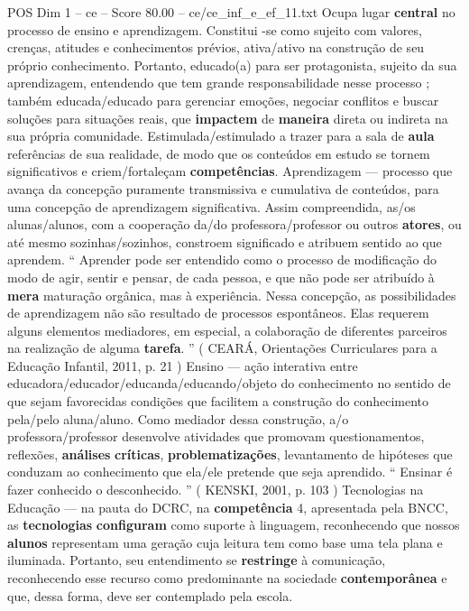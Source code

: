 \begin{textsample}{POS Dim 1 – ce – Score 80.00 – ce/ce\_inf\_e\_ef\_11.txt}
Ocupa lugar \textbf{central} no processo de ensino e aprendizagem.
Constitui -se como sujeito com valores, crenças, atitudes e conhecimentos prévios, ativa/ativo na construção de seu próprio conhecimento.
Portanto, educado(a) para ser protagonista, sujeito da sua aprendizagem, entendendo que tem grande responsabilidade nesse processo ; também educada/educado para gerenciar emoções, negociar conflitos e buscar soluções para situações reais, que \textbf{impactem} de \textbf{maneira} direta ou indireta na sua própria comunidade.
Estimulada/estimulado a trazer para a sala de \textbf{aula} referências de sua realidade, de modo que os conteúdos em estudo se tornem significativos e criem/fortaleçam \textbf{competências}.
Aprendizagem — processo que avança da concepção puramente transmissiva e cumulativa de conteúdos, para uma concepção de aprendizagem significativa.
Assim compreendida, as/os alunas/alunos, com a cooperação da/do professora/professor ou outros \textbf{atores}, ou até mesmo sozinhas/sozinhos, constroem significado e atribuem sentido ao que aprendem. “ Aprender pode ser entendido como o processo de modificação do modo de agir, sentir e pensar, de cada pessoa, e que não pode ser atribuído à \textbf{mera} maturação orgânica, mas à experiência.
Nessa concepção, as possibilidades de aprendizagem não são resultado de processos espontâneos.
Elas requerem alguns elementos mediadores, em especial, a colaboração de diferentes parceiros na realização de alguma \textbf{tarefa}. ” ( CEARÁ, Orientações Curriculares para a Educação Infantil, 2011, p. 21 ) Ensino — ação interativa entre educadora/educador/educanda/educando/objeto do conhecimento no sentido de que sejam favorecidas condições que facilitem a construção do conhecimento pela/pelo aluna/aluno.
Como mediador dessa construção, a/o professora/professor desenvolve atividades que promovam questionamentos, reflexões, \textbf{análises} \textbf{críticas}, \textbf{problematizações}, levantamento de hipóteses que conduzam ao conhecimento que ela/ele pretende que seja aprendido. “ Ensinar é fazer conhecido o desconhecido. ” ( KENSKI, 2001, p. 103 ) Tecnologias na Educação — na pauta do DCRC, na \textbf{competência} 4, apresentada pela BNCC, as \textbf{tecnologias} \textbf{configuram} como suporte à linguagem, reconhecendo que nossos \textbf{alunos} representam uma geração cuja leitura tem como base uma tela plana e iluminada.
Portanto, seu entendimento se \textbf{restringe} à comunicação, reconhecendo esse recurso como predominante na sociedade \textbf{contemporânea} e que, dessa forma, deve ser contemplado pela escola.

\end{textsample}

